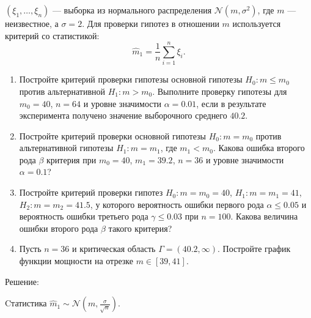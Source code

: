 \documentclass[a4paper,12pt]{article}
\newif\ifsolutions
\begin{document}
$\left( \xi_1, \dots, \xi_n \right)$ --- выборка из нормального распределения $\mathcal{N} \left( m, \sigma^2 \right)$, где $m$ --- неизвестное,
а $\sigma = 2$. Для проверки гипотез в отношении $m$ используется критерий со статистикой:
\[
    \widehat{m}_1 = \frac{1}{n} \sum_{i=1}^n \xi_i .
\]
\begin{enumerate}
    \item Постройте критерий проверки гипотезы основной гипотезы $H_0: m \le m_0$ против альтернативной $H_1: m > m_0$. Выполните проверку гипотезы
          для $m_0 = 40$, $n = 64$ и уровне значимости $\alpha = 0.01$, если в результате эксперимента получено значение выборочного среднего $40.2$.
    \item Постройте критерий проверки основной гипотезы $H_0: m = m_0$ против альтернативной гипотезы $H_1: m = m_1$, где $m_1 < m_0$. Какова ошибка
          второго рода $\beta$ критерия при $m_0 = 40$, $m_1 = 39.2$, $n=36$ и уровне значимости $\alpha = 0.1$?
    \item Постройте критерий проверки гипотез $H_0: m = m_0 = 40$, $H_1: m = m_1 = 41$, $H_2: m = m_2 = 41.5$, у которого вероятность ошибки первого
          рода $\alpha \le 0.05$ и вероятность ошибки третьего рода $\gamma \le 0.03$ при $n = 100$. Какова величина ошибки второго рода $\beta$
          такого критерия?
    \item Пусть $n=36$ и критическая область $\Gamma = (40.2, \infty)$. Постройте график функции мощности на отрезке $m \in [39, 41]$.
\end{enumerate}

\ifsolutions Решение: \par
    Cтатистика $\widehat{m}_1 \sim \mathcal{N} (m, \frac{\sigma}{\sqrt{n}})$.
\end{document}
